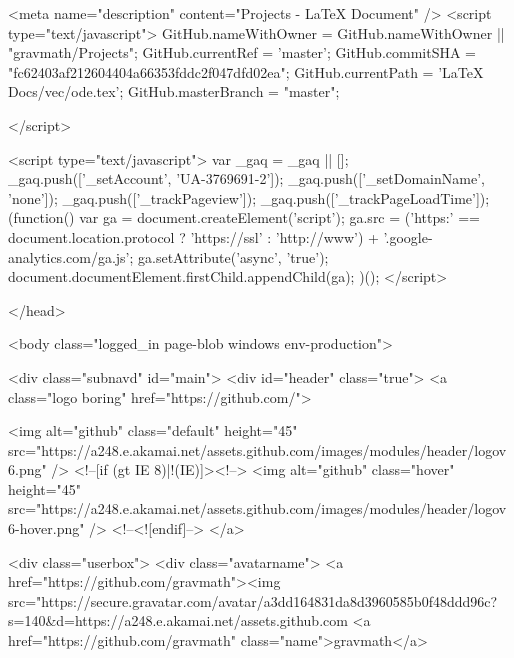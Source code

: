     

    <meta name="description" content="Projects - LaTeX Document" />
    <script type="text/javascript">
      GitHub.nameWithOwner = GitHub.nameWithOwner || "gravmath/Projects";
      GitHub.currentRef = 'master';
      GitHub.commitSHA = "fc62403af212604404a66353fddc2f047dfd02ea";
      GitHub.currentPath = 'LaTeX Docs/vec/ode.tex';
      GitHub.masterBranch = "master";

      
    </script>
  

        <script type="text/javascript">
      var _gaq = _gaq || [];
      _gaq.push(['_setAccount', 'UA-3769691-2']);
      _gaq.push(['_setDomainName', 'none']);
      _gaq.push(['_trackPageview']);
      _gaq.push(['_trackPageLoadTime']);
      (function() {
        var ga = document.createElement('script');
        ga.src = ('https:' == document.location.protocol ? 'https://ssl' : 'http://www') + '.google-analytics.com/ga.js';
        ga.setAttribute('async', 'true');
        document.documentElement.firstChild.appendChild(ga);
      })();
    </script>

    
  </head>

  

  <body class="logged_in page-blob windows env-production">
    

    

    

    <div class="subnavd" id="main">
      <div id="header" class="true">
          <a class="logo boring" href="https://github.com/">
            
            <img alt="github" class="default" height="45" src="https://a248.e.akamai.net/assets.github.com/images/modules/header/logov6.png" />
            <!--[if (gt IE 8)|!(IE)]><!-->
            <img alt="github" class="hover" height="45" src="https://a248.e.akamai.net/assets.github.com/images/modules/header/logov6-hover.png" />
            <!--<![endif]-->
          </a>

        
          





  
    <div class="userbox">
      <div class="avatarname">
        <a href="https://github.com/gravmath"><img src="https://secure.gravatar.com/avatar/a3dd164831da8d3960585b0f48ddd96c?s=140&d=https://a248.e.akamai.net/assets.github.com%
        <a href="https://github.com/gravmath" class="name">gravmath</a>

